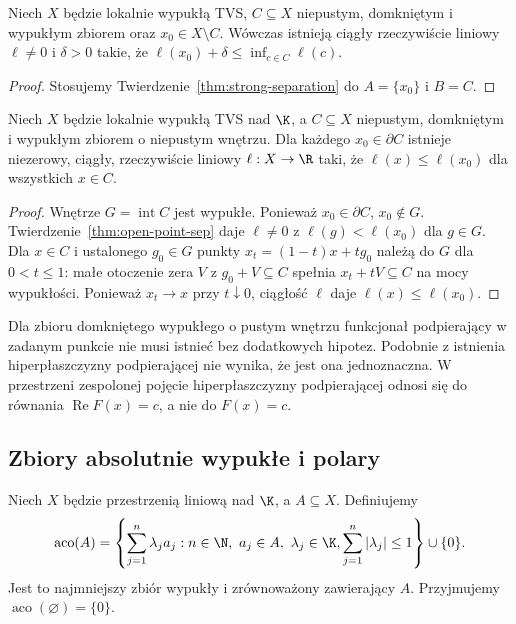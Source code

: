 \begin{wniosek}
\label{cor:point-closed-convex}
Niech $X$ będzie lokalnie wypukłą TVS, $C\subseteq X$
niepustym, domkniętym i wypukłym zbiorem oraz
$x_0\in X\setminus C$. Wówczas istnieją
ciągły rzeczywiście liniowy $\ell\ne0$ i $\delta>0$
takie, że $\ell(x_0)+\delta\le\inf_{c\in C}\ell(c)$.
\end{wniosek}
\begin{proof}
Stosujemy Twierdzenie~\ref{thm:strong-separation}
do $A=\{x_0\}$ i $B=C$.
\end{proof}

\begin{twierdzenie}
\label{thm:supporting-hyperplane}
Niech $X$ będzie lokalnie wypukłą TVS nad $\K$,
a $C\subseteq X$ niepustym, domkniętym i wypukłym
zbiorem o niepustym wnętrzu. Dla każdego $x_0\in\partial C$
istnieje niezerowy, ciągły, rzeczywiście liniowy
$\ell:X\to\R$ taki, że $\ell(x)\le\ell(x_0)$
dla wszystkich $x\in C$.
\end{twierdzenie}
\begin{proof}
Wnętrze $G=\operatorname{int} C$ jest wypukłe.
Ponieważ $x_0\in\partial C$, $x_0\notin G$.
Twierdzenie~\ref{thm:open-point-sep} daje $\ell\ne0$
z $\ell(g)<\ell(x_0)$ dla $g\in G$.
Dla $x\in C$ i ustalonego $g_0\in G$ punkty
$x_t=(1-t)x+tg_0$ należą do $G$ dla $0<t\le1$:
małe otoczenie zera $V$ z $g_0+V\subseteq C$
spełnia $x_t+tV\subseteq C$ na mocy wypukłości.
Ponieważ $x_t\to x$ przy $t\downarrow0$, ciągłość
$\ell$ daje $\ell(x)\le\ell(x_0)$.
\end{proof}

\begin{uwaga}
Dla zbioru domkniętego wypukłego o pustym wnętrzu
funkcjonał podpierający w zadanym punkcie nie musi
istnieć bez dodatkowych hipotez. Podobnie z istnienia
hiperpłaszczyzny podpierającej nie wynika, że jest ona
jednoznaczna. W przestrzeni zespolonej pojęcie
hiperpłaszczyzny podpierającej odnosi się do równania
$\operatorname{Re}F(x)=c$, a nie do $F(x)=c$.
\end{uwaga}

\subsection{Zbiory absolutnie wypukłe i polary}

\begin{definicja}
\label{def:absolutely-convex-hull}
Niech $X$ będzie przestrzenią liniową nad $\K$, a $A\subseteq X$.
Definiujemy
\[
\operatorname{aco}(A)=\left\{\sum_{j=1}^n\lambda_j a_j:
 n\in\N,\ a_j\in A,\ \lambda_j\in\K,
 \sum_{j=1}^n|\lambda_j|\le1\right\}\cup\{0\}.
\]
Jest to najmniejszy zbiór wypukły i zrównoważony zawierający $A$.
Przyjmujemy $\operatorname{aco}(\varnothing)=\{0\}$.
\end{definicja}

